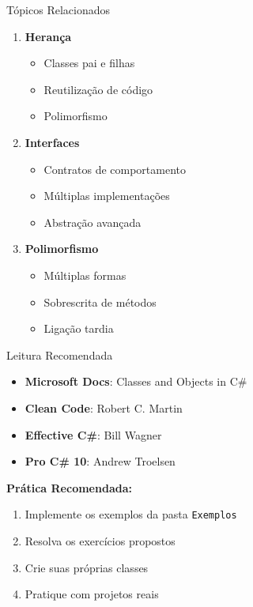 \documentclass[aspectratio=169]{beamer}
\begin{document}
\begin{frame}{Tópicos Relacionados}
\begin{enumerate}
\item \textbf{Herança}
\begin{itemize}
\item Classes pai e filhas
\item Reutilização de código
\item Polimorfismo
\end{itemize}

\item \textbf{Interfaces}
\begin{itemize}
\item Contratos de comportamento
\item Múltiplas implementações
\item Abstração avançada
\end{itemize}

\item \textbf{Polimorfismo}
\begin{itemize}
\item Múltiplas formas
\item Sobrescrita de métodos
\item Ligação tardia
\end{itemize}
\end{enumerate}
\end{frame}

\begin{frame}{Leitura Recomendada}
\begin{itemize}
\item \textbf{Microsoft Docs}: Classes and Objects in C\#
\item \textbf{Clean Code}: Robert C. Martin
\item \textbf{Effective C\#}: Bill Wagner
\item \textbf{Pro C\# 10}: Andrew Troelsen
\end{itemize}

\vspace{0.5cm}
\textbf{Prática Recomendada:}
\begin{enumerate}
\item Implemente os exemplos da pasta \texttt{Exemplos}
\item Resolva os exercícios propostos
\item Crie suas próprias classes
\item Pratique com projetos reais
\end{enumerate}
\end{frame}
\end{document}
